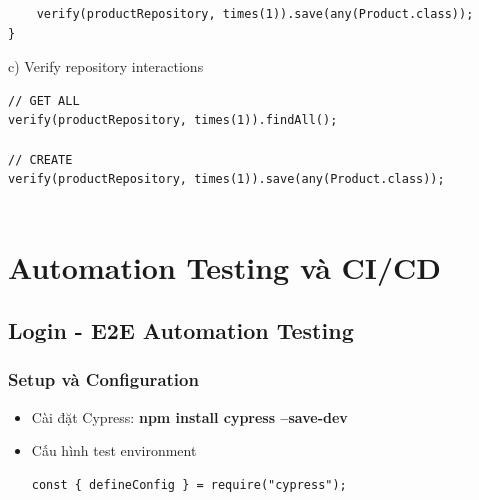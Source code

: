 \documentclass[a4paper,12pt]{article}
\begin{document}
{\begin{tcolorbox}[breakable, colback=green!5,colframe=black!50,title=Test Service Layer Với Mocked Repository ]
\begin{lstlisting}
    verify(productRepository, times(1)).save(any(Product.class));
}
\end{lstlisting}
\end{tcolorbox}
c) Verify repository interactions
\begin{tcolorbox}[breakable, colback=green!5,colframe=black!50,title= Verify Repository Interactions ]
\begin{lstlisting}
// GET ALL
verify(productRepository, times(1)).findAll();

// CREATE
verify(productRepository, times(1)).save(any(Product.class));


\end{lstlisting}
\end{tcolorbox}
\section{Automation Testing và CI/CD}

\subsection{ Login - E2E Automation Testing}

\subsubsection{Setup và Configuration}


\begin{itemize}
    \item Cài đặt Cypress: \textbf{npm install cypress --save-dev}





    \item Cấu hình test environment
\begin{tcolorbox}[breakable, colback=green!5,colframe=black!50,title=Test Environment ]
\begin{lstlisting}
const { defineConfig } = require("cypress");


\end{lstlisting}
\end{tcolorbox}
\end{itemize}}
\end{document}
